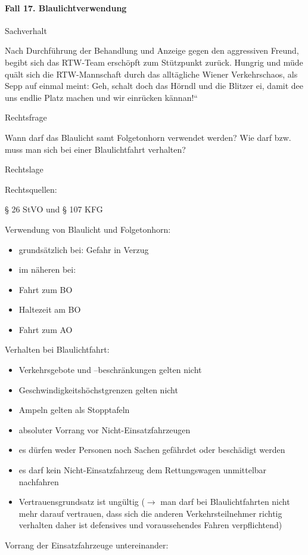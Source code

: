 \documentclass{article}
\begin{document}
\paragraph{Fall 17. Blaulichtverwendung}
Sachverhalt

Nach Durchf\"uhrung der Behandlung und Anzeige gegen den aggressiven
Freund, begibt sich das RTW-Team ersch\"opft zum St\"utzpunkt zur\"uck.
Hungrig und m\"ude qu\"alt sich die RTW-Mannschaft durch das
allt\"agliche Wiener Verkehrschaos, als Sepp auf einmal meint:
{\quotedblbase} Geh, schalt doch das H\"orndl und die Blitzer ei, damit
dee uns endlie Platz machen und wir einr\"ucken
k\"annan!{\textquotedblleft}

Rechtsfrage

Wann darf das Blaulicht samt Folgetonhorn verwendet werden? Wie darf
bzw. muss man sich bei einer Blaulichtfahrt verhalten?

Rechtslage

Rechtsquellen:

{\S} 26 StVO und {\S} 107 KFG

Verwendung von Blaulicht und Folgetonhorn:

\begin{itemize}
\item grunds\"atzlich bei: Gefahr in Verzug

\item im n\"aheren bei:

\end{itemize}
\begin{itemize}
\item Fahrt zum BO

\item Haltezeit am BO

\item Fahrt zum AO

\end{itemize}
Verhalten bei Blaulichtfahrt:

\begin{itemize}
\item Verkehrsgebote und --beschr\"ankungen gelten nicht

\item Geschwindigkeitsh\"ochstgrenzen gelten nicht

\item Ampeln gelten als Stopptafeln

\item absoluter Vorrang vor Nicht-Einsatzfahrzeugen

\item es d\"urfen weder Personen noch Sachen gef\"ahrdet oder
besch\"adigt werden

\item es darf kein Nicht-Einsatzfahrzeug dem Rettungswagen unmittelbar
nachfahren

\item Vertrauensgrundsatz ist ung\"ultig (${\rightarrow}$ man darf bei
Blaulichtfahrten nicht mehr darauf vertrauen, dass sich die anderen
Verkehrsteilnehmer richtig verhalten daher ist defensives und
voraussehendes Fahren verpflichtend)

\end{itemize}
Vorrang der Einsatzfahrzeuge untereinander:
\end{document}
